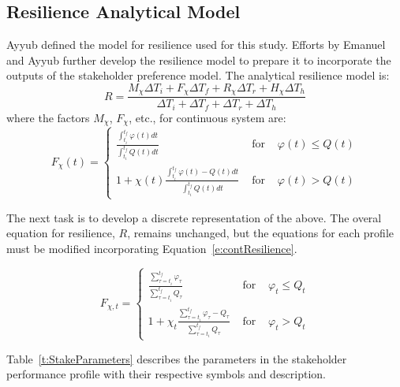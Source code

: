 \documentclass[preprint,12pt]{elsarticle}
\begin{document}
\subsection{Resilience Analytical Model}


Ayyub \cite{Ayyub2014a} defined the model for resilience used for
this study. Efforts by Emanuel and Ayyub
\cite{Emanuel2017,Emanuel2018} further develop the resilience model
to prepare it to incorporate the outputs of the stakeholder preference
model. The analytical resilience model is:
\begin{equation}
  \label{e:contResilience}
    R = \frac{M_{\chi} \Delta T_i + F_{\chi} \Delta T_f + R_{\chi}
    \Delta T_r + H_{\chi} \Delta T_h}
  {\Delta T_i + \Delta T_f + \Delta T_r + \Delta T_h}
\end{equation}
where the factors $M_{\chi}$, $F_{\chi}$, etc., for continuous system are:
\begin{equation}
  \label{e:RPC}
  F_{\chi}(t) = \left\{\begin{array}{rcl}
      \frac{\displaystyle\int_{t_i}^{t_f}\varphi(t)dt}{\displaystyle\int_{t_i}^{t_f}Q(t)dt}
      & \text{ for } & \varphi(t) \leq Q(t) \\
      1 + \chi(t)
      \frac{\displaystyle\int_{t_i}^{t_f}\varphi(t)-Q(t)dt}{\displaystyle\int_{t_i}^{t_f}Q(t)dt}
      & \text{ for } & \varphi(t) > Q(t)
      \end{array}\right.
\end{equation}

The next task is to develop a discrete representation of the
above. The overal equation for resilience, $R$, remains unchanged, but
the equations for each profile must be modified incorporating
Equation~\ref{e:contResilience}.

\begin{equation}
  \label{e:RPD}
  F_{\chi,t} = \left\{\begin{array}{rcl}
    \frac{\displaystyle\sum_{\tau=t_{i}}^{t_f}\varphi_{\tau}}{\displaystyle\sum_{\tau=t_i}^{t_f}Q_{\tau}}
    & \text{ for } &
    \varphi_{t} \leq Q_t \\
      1 + \chi_t
      \frac{\displaystyle\sum_{\tau = t_i}^{t_f}\varphi_{\tau}-Q_{\tau}}{\displaystyle\sum_{\tau = t_i}^{t_f}Q_{\tau}}
      & \text{ for } &
      \varphi_{t} > Q_{t}
  \end{array}\right.
\end{equation}




Table~\ref{t:StakeParameters} describes the parameters in the
stakeholder performance profile with their respective symbols and
description.
\end{document}
